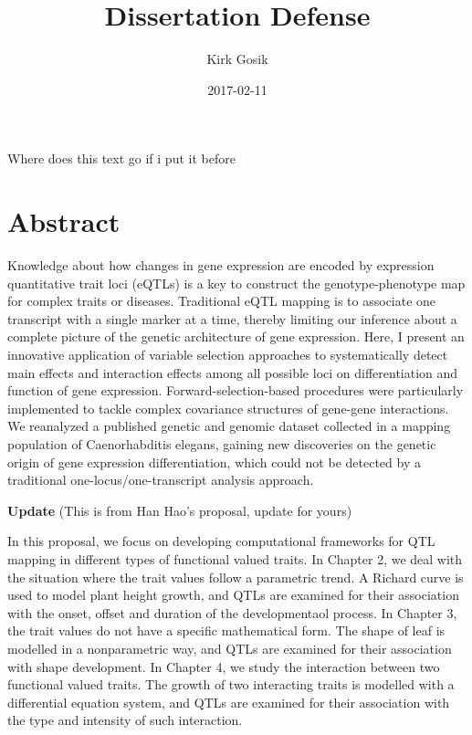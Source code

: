 \documentclass[]{book}
\title{Dissertation Defense}
\author{Kirk Gosik}
\date{2017-02-11}
\theoremstyle{definition}
\theoremstyle{definition}
\theoremstyle{remark}
\begin{document}
\maketitle

{
\setcounter{tocdepth}{1}
\tableofcontents
}
\listoftables
\listoffigures
Where does this text go if i put it before

\chapter*{Abstract}\label{abstract}

Knowledge about how changes in gene expression are encoded by expression
quantitative trait loci (eQTLs) is a key to construct the
genotype-phenotype map for complex traits or diseases. Traditional eQTL
mapping is to associate one transcript with a single marker at a time,
thereby limiting our inference about a complete picture of the genetic
architecture of gene expression. Here, I present an innovative
application of variable selection approaches to systematically detect
main effects and interaction effects among all possible loci on
differentiation and function of gene expression. Forward-selection-based
procedures were particularly implemented to tackle complex covariance
structures of gene-gene interactions. We reanalyzed a published genetic
and genomic dataset collected in a mapping population of Caenorhabditis
elegans, gaining new discoveries on the genetic origin of gene
expression differentiation, which could not be detected by a traditional
one-locus/one-transcript analysis approach.

\textbf{Update} (This is from Han Hao's proposal, update for yours)

In this proposal, we focus on developing computational frameworks for
QTL mapping in different types of functional valued traits. In Chapter
2, we deal with the situation where the trait values follow a parametric
trend. A Richard curve is used to model plant height growth, and QTLs
are examined for their association with the onset, offset and duration
of the developmentaol process. In Chapter 3, the trait values do not
have a specific mathematical form. The shape of leaf is modelled in a
nonparametric way, and QTLs are examined for their association with
shape development. In Chapter 4, we study the interaction between two
functional valued traits. The growth of two interacting traits is
modelled with a differential equation system, and QTLs are examined for
their association with the type and intensity of such interaction.
\end{document}
